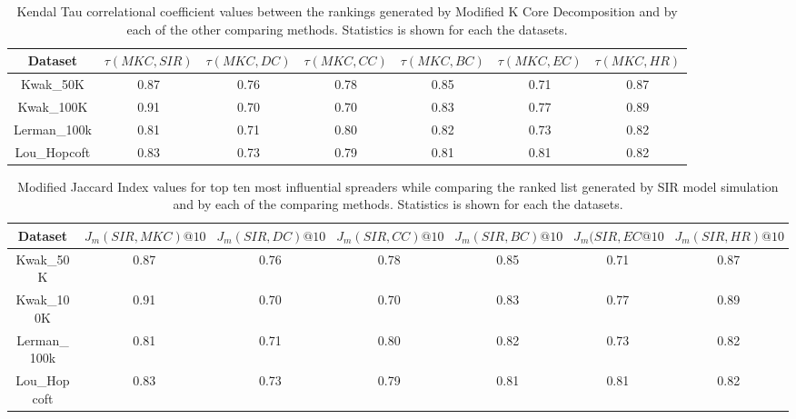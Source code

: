 \documentclass[sigconf]{acmart}
\begin{document}
\begin{table}
	\caption{Kendal Tau correlational coefficient values between the rankings generated by Modified K Core Decomposition and by each of the other comparing methods. Statistics is shown for each the datasets.}
	\begin{adjustbox}{width={ .7\textwidth},totalheight={\textheight},keepaspectratio}%
		\begin{tabular}{|c|c|c|c|c|c|c|}
			\toprule
			Dataset &$\tau(MKC,SIR)$  &$\tau(MKC,DC)$ &$\tau(MKC,CC)$ &$\tau(MKC,BC)$  &$\tau(MKC,EC)$ &$\tau(MKC,HR)$\\
			\midrule
			Kwak\_50K & 0.87 & 0.76 & 0.78 & 0.85 & 0.71 & 0.87 \\
			\hline
			Kwak\_100K & 0.91 & 0.70 & 0.70 & 0.83 & 0.77 & 0.89 \\
			\hline
			Lerman\_100k& 0.81 & 0.71 & 0.80 & 0.82 & 0.73 & 0.82 \\
			\hline
			Lou\_Hopcoft& 0.83 & 0.73 & 0.79 & 0.81 & 0.81 & 0.82 \\
			\bottomrule
		\end{tabular}
	\label{Kendall Tau 2}
	\end{adjustbox}
\end{table} 

\begin{table}
	\caption{Modified Jaccard Index values for top ten most influential spreaders while comparing the ranked list generated by SIR model simulation and by each of the comparing methods. Statistics is shown for each the datasets.}
	\begin{adjustbox}{width={ .7\textwidth},totalheight={\textheight},keepaspectratio}%
		\begin{tabular}{|c|c|c|c|c|c|c|}
			\toprule
			Dataset &$J_m(SIR,MKC)@10$  &$J_m(SIR,DC)@10$ &$J_m(SIR,CC)@10$ &$J_m(SIR,BC)@10$ &$J_m(SIR,EC@10$ &$J_m(SIR,HR)@10$\\
			\midrule
			Kwak\_50K & 0.87 & 0.76 & 0.78 & 0.85 & 0.71 & 0.87 \\
			\hline
			Kwak\_100K & 0.91 & 0.70 & 0.70 & 0.83 & 0.77 & 0.89 \\
			\hline
			Lerman\_100k& 0.81 & 0.71 & 0.80 & 0.82 & 0.73 & 0.82 \\
			\hline
			Lou\_Hopcoft& 0.83 & 0.73 & 0.79 & 0.81 & 0.81 & 0.82 \\
			\bottomrule
		\end{tabular}
	\label{jaccard index}
	\end{adjustbox}
\end{table} 
\end{document}
